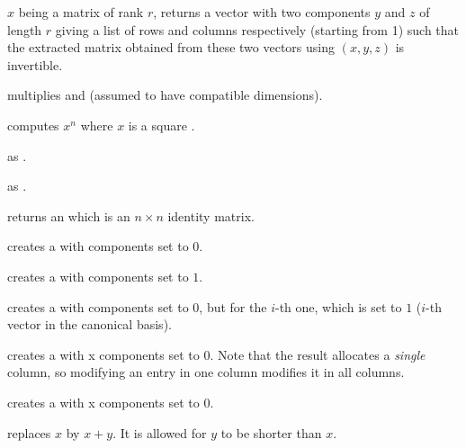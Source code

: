  $x$ being a matrix of rank $r$, returns a
vector with two  components $y$ and $z$ of length $r$ giving a
list of rows and columns respectively (starting from 1) such that the extracted
matrix obtained from these two vectors using $(x,y,z)$ is
invertible.

 multiplies   and  (assumed to
have compatible dimensions).

 computes $x^n$ where $x$ is a square
.

 as .

 as .

 returns an  which is an $n \times n$
identity matrix.

 creates a  with  components set to
$0$.

 creates a  with  components set to
$1$.

 creates a  with  components
set to $0$, but for the $i$-th one, which is set to $1$ ($i$-th vector in the
canonical basis).

 creates a  with  x 
components set to $0$. Note that the result allocates a
\emph{single} column, so modifying an entry in one column modifies it in
all columns.

 creates a  with  x
 components set to $0$.











 replaces $x$ by $x+y$. It is
allowed for $y$ to be shorter than $x$.

